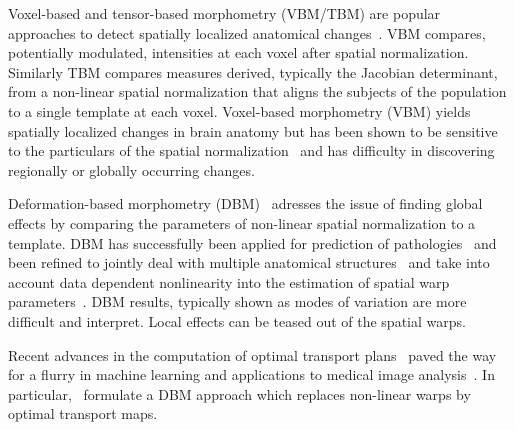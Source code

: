 \documentclass{llncs}
\begin{document}

Voxel-based and tensor-based morphometry (VBM/TBM) are popular approaches to
detect spatially localized anatomical changes~\citep{ashburner2000voxel}. VBM
compares, potentially modulated, intensities at each voxel after
spatial normalization. Similarly TBM compares measures derived, typically the
Jacobian determinant, from a non-linear spatial normalization that aligns the
subjects of the population to a single template at each voxel. 
Voxel-based
morphometry (VBM) yields spatially localized changes in brain anatomy but has
been shown to be sensitive to the particulars of the spatial
normalization~\citep{bookstein2001voxel, davatzikos2004voxel} and has
difficulty in discovering regionally or globally occurring changes. 

Deformation-based morphometry (DBM)~\citep{ashburner1998identifying} adresses
the issue of finding global effects by comparing the parameters of non-linear
spatial normalization to a template.  DBM has successfully been applied for
prediction of pathologies~\citep{gaser2001deformation,lao2004morphological} and been refined to
jointly deal with multiple anatomical
structures~\cite{durrleman2014morphometry} and take into account data dependent
nonlinearity into the estimation of spatial warp
parameters~\citep{gerber2010manifold}. DBM results, typically shown as modes of
variation are more difficult and interpret. Local effects can be teased out of
the spatial warps.

Recent advances in the computation of optimal transport
plans~\citep{cuturi2013sinkhorn,gerber2017multiscale} paved the way for a
flurry in machine learning and applications to medical image
analysis~\citep{cuturi2014fast,gramfort2015fast,rolet2018blind}. In
particular,~\citet{gramfort2015fast} formulate a DBM approach which replaces
non-linear warps by optimal transport maps. 
\end{document}
